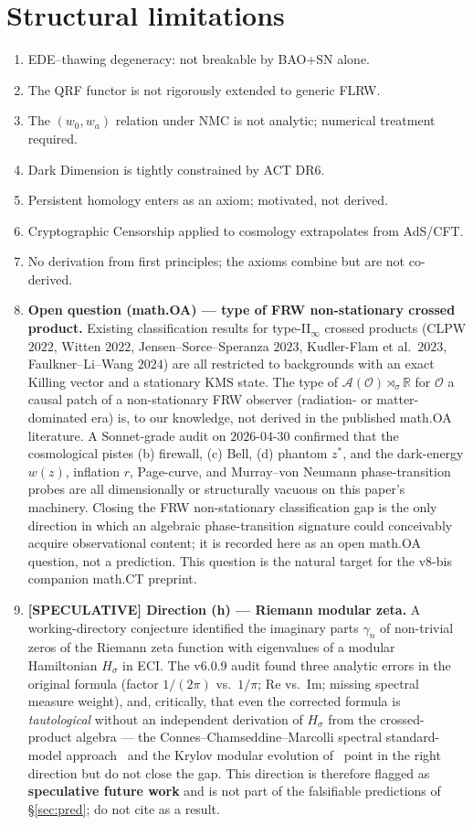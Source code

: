 \documentclass[reprint,amsmath,amssymb,aps,prd,superscriptaddress]{revtex4-2}
\providecommand{\1}{\mathbf{1}}
\begin{document}
\section{Structural limitations}\label{sec:limits}

\begin{enumerate}
\item EDE--thawing degeneracy: not breakable by BAO+SN alone.
\item The QRF functor is not rigorously extended to generic FLRW.
\item The $(w_0, w_a)$ relation under NMC is not analytic; numerical treatment required.
\item Dark Dimension is tightly constrained by ACT DR6.
\item Persistent homology enters as an axiom; motivated, not derived.
\item Cryptographic Censorship applied to cosmology extrapolates from AdS/CFT.
\item No derivation from first principles; the axioms combine but are not co-derived.
\item \textbf{Open question (math.OA) --- type of FRW non-stationary crossed product.}
Existing classification results for type-II$_\infty$ crossed products (CLPW $2022$, Witten $2022$, Jensen--Sorce--Speranza $2023$, Kudler-Flam et al.\ $2023$, Faulkner--Li--Wang $2024$) are all restricted to backgrounds with an exact Killing vector and a stationary KMS state. The type of $\mathcal{A}(\mathcal{O})\rtimes_\sigma\mathbb{R}$ for $\mathcal{O}$ a causal patch of a non-stationary FRW observer (radiation- or matter-dominated era) is, to our knowledge, not derived in the published math.OA literature. A Sonnet-grade audit on $2026$-$04$-$30$ confirmed that the cosmological pistes (b) firewall, (c) Bell, (d) phantom $z^*$, and the dark-energy $w(z)$, inflation $r$, Page-curve, and Murray--von Neumann phase-transition probes are all dimensionally or structurally vacuous on this paper's machinery. Closing the FRW non-stationary classification gap is the only direction in which an algebraic phase-transition signature could conceivably acquire observational content; it is recorded here as an open math.OA question, not a prediction. This question is the natural target for the v8-bis companion math.CT preprint.
\item \textbf{[SPECULATIVE] Direction (h) --- Riemann modular zeta.} A working-directory conjecture identified the imaginary parts $\gamma_n$ of non-trivial zeros of the Riemann zeta function with eigenvalues of a modular Hamiltonian $H_\sigma$ in ECI. The v6.0.9 audit found three analytic errors in the original formula (factor $1/(2\pi)$ vs.\ $1/\pi$; $\mathrm{Re}$ vs.\ $\mathrm{Im}$; missing spectral measure weight), and, critically, that even the corrected formula is \emph{tautological} without an independent derivation of $H_\sigma$ from the crossed-product algebra --- the Connes--Chamseddine--Marcolli spectral standard-model approach~\cite{CCM2025} and the Krylov modular evolution of~\cite{Caputa2024} point in the right direction but do not close the gap. This direction is therefore flagged as \textbf{speculative future work} and is not part of the falsifiable predictions of \S\ref{sec:pred}; do not cite as a result.

\end{enumerate}
\end{document}
